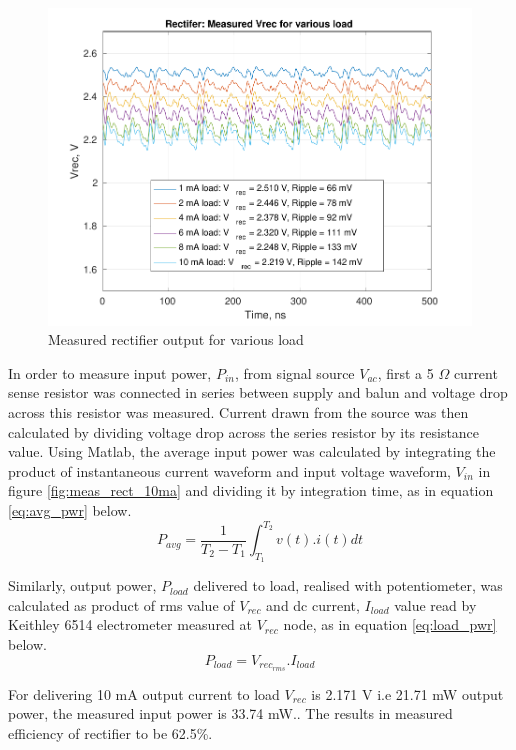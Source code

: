 \documentclass[12pt,a4paper,UKenglish]{report}
\begin{document}
\begin{figure} [!htbp]
  \centering
  \includegraphics[width=\textwidth]{img/meas/rect_load_sweep.pdf} 
 \caption{Measured rectifier output for various load} 
\label{fig:meas_rect_load_sweep} 
\end{figure}

In order to measure input power, $P_{in}$, from signal source $V_{ac}$, first a 5 $\Omega $ current sense resistor was connected in series between supply and balun and voltage drop across this 
 resistor was measured. Current drawn from the source was then calculated by dividing voltage drop across the series resistor by its resistance value.
 Using Matlab, the average input power was calculated by integrating the product of instantaneous current waveform and input voltage waveform, $V_{in}$  in figure \ref{fig:meas_rect_10ma} and dividing 
 it by integration time, as in equation \ref{eq:avg_pwr} below.
 \begin{equation} \label{eq:avg_pwr} 
P_{avg} = \frac{1}{T_{2}-T_{1}}\int_{T_{1}}^{T_{2}} v(t).i(t) dt
\end{equation}

Similarly, output power, $P_{load}$ delivered to load, realised with potentiometer, was calculated as product of rms value of $V_{rec}$ 
and dc current, $I_{load}$ value read by Keithley 6514 electrometer measured at $V_{rec}$ node, as in equation \ref{eq:load_pwr} below.
\begin{equation} \label{eq:load_pwr} 
P_{load} = V_{rec_{rms}}.I_{load}
\end{equation}

For delivering 10 mA output current to load  $V_{rec}$ is 2.171 V i.e 21.71 mW output power, the measured input power is 33.74 mW.. The results 
in measured efficiency of rectifier to be 62.5\%.
\end{document}
